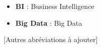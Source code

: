\begin{itemize}
    \item \textbf{BI} : Business Intelligence
    \item \textbf{Big Data} : Big Data
\end{itemize}

[Autres abréviations à ajouter]
